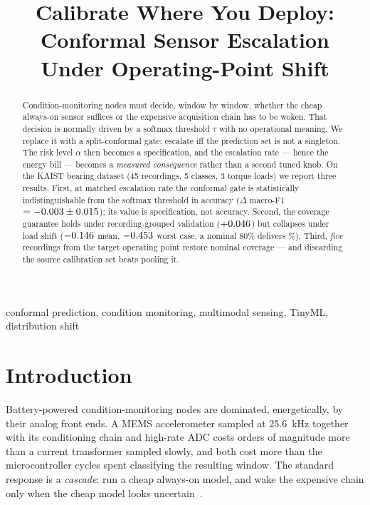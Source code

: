 \documentclass[conference,10pt]{IEEEtran}          %
\title{Calibrate Where You Deploy: Conformal Sensor Escalation\\
       Under Operating-Point Shift}
\author{\IEEEauthorblockN{Cândido de Lucena Filho}
\IEEEauthorblockA{Escola Politécnica, Universidade de São Paulo\\
São Paulo, Brazil\\
\TODO{e-mail, coautores, e o agradecimento de fomento}}}
\begin{document}
\maketitle

\begin{abstract}
Condition-monitoring nodes must decide, window by window, whether the
cheap always-on sensor suffices or the expensive acquisition chain has to
be woken. That decision is normally driven by a softmax threshold
$\tau$ with no operational meaning. We replace it with a split-conformal
gate: escalate iff the prediction set is not a singleton. The risk level
$\alpha$ then becomes a specification, and the escalation rate --- hence
the energy bill --- becomes a \emph{measured consequence} rather than a
second tuned knob. On the KAIST bearing dataset (45 recordings, 5 classes,
3 torque loads) we report three results. First, at matched escalation rate
the conformal gate is statistically indistinguishable from the softmax
threshold in accuracy ($\Delta$ macro-F1 $= -0.003 \pm 0.015$); its value is
specification, not accuracy. Second, the coverage guarantee holds under
recording-grouped validation ($+0.046$) but collapses under load
shift ($-0.146$ mean, $-0.453$ worst case: a nominal 80\% delivers
\covEighty\%). Third, \emph{five} recordings from the target operating
point restore nominal coverage --- and discarding the source calibration
set beats pooling it.
\end{abstract}

\begin{IEEEkeywords}
conformal prediction, condition monitoring, multimodal sensing, TinyML,
distribution shift
\end{IEEEkeywords}

\section{Introduction}

Battery-powered condition-monitoring nodes are dominated, energetically, by
their analog front ends. A MEMS accelerometer sampled at
\SI{25.6}{\kilo\hertz} together with its conditioning chain and
high-rate ADC costs orders of magnitude more than a current transformer
sampled slowly, and both cost more than the microcontroller cycles spent
classifying the resulting window. The standard response is a
\emph{cascade}: run a cheap always-on model, and wake the expensive chain
only when the cheap model looks uncertain~\cite{TODOcascade}.
\end{document}
